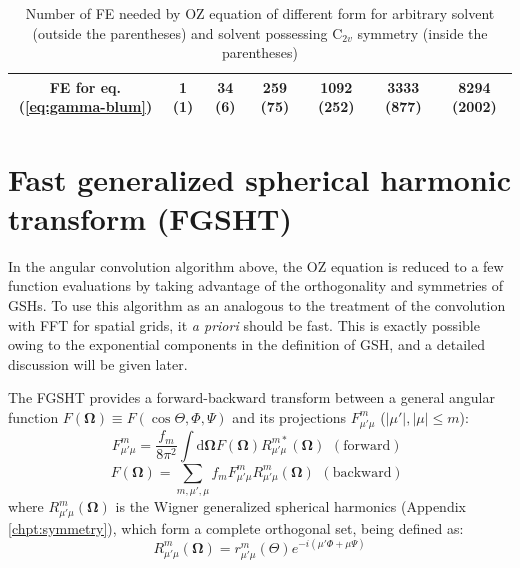 \begin{table}[h]
\begin{minipage}[t]{1.1\columnwidth}
\begin{center}
\begin{tabular*}{1\textwidth}{@{\extracolsep{\fill}}ccccccc}
{\footnotesize{}FE for eq. (\ref{eq:gamma-blum})} & {\footnotesize{}1 (1)} & {\footnotesize{}34 (6)} & {\footnotesize{}259 (75)} & {\footnotesize{}1092 (252)} & {\footnotesize{}3333 (877)} & {\footnotesize{}8294 (2002)}\tabularnewline
\bottomrule
\end{tabular*}\caption[Number of FE needed by OZ equation of different form]{Number of \acs{FE} needed by \acs{OZ} equation of different form
for arbitrary solvent (outside the parentheses) and solvent possessing
$\mathrm{C}_{2v}$ symmetry (inside the parentheses)\label{tab:FE-of-OZ}}
\par\end{center}%
\end{minipage}
\end{table}


\section{Fast generalized spherical harmonic transform (FGSHT)\label{sec:fgsht}}

In the angular convolution algorithm above, the \acs{OZ} equation
is reduced to a few function evaluations by taking advantage of the
orthogonality and symmetries of \acs{GSH}s. To use this algorithm
as an analogous to the treatment of the convolution with \acs{FFT}
for spatial grids, it \textit{a priori }should be fast. This is exactly
possible owing to the exponential components in the definition of
\acs{GSH}, and a detailed discussion will be given later.

The \acs{FGSHT} provides a forward-backward transform between a general
angular function $F(\mathbf{\Omega})\equiv F(\cos\Theta,\Phi,\Psi)$
and its projections $F_{\mu'\mu}^{m}$ ($\left|\mu'\right|,\left|\mu\right|\leq m$):
\begin{equation}
F_{\mu'\mu}^{m}=\frac{f_{m}}{8\pi^{2}}\int\mathrm{d}\mathbf{\Omega}F(\mathbf{\Omega})R_{\mu'\mu}^{m*}(\mathbf{\Omega})\begin{array}{c}
\mathrm{(forward)}\end{array}\label{eq:GSHT_forward}
\end{equation}
\begin{equation}
F(\mathbf{\Omega})=\sum_{m,\mu',\mu}f_{m}F_{\mu'\mu}^{m}R_{\mu'\mu}^{m}(\mathbf{\Omega})\begin{array}{c}
\mathrm{(backward)}\end{array}\label{eq:GSHT_backward}
\end{equation}
where $R_{\mu'\mu}^{m}(\mathbf{\Omega})$ is the Wigner generalized
spherical harmonics (Appendix \ref{chpt:symmetry}), which form a
complete orthogonal set, being defined as:
\begin{equation}
R_{\mu'\mu}^{m}(\mathbf{\Omega})=r_{\mu'\mu}^{m}(\Theta)e^{-i(\mu'\Phi+\mu\Psi)}
\end{equation}


